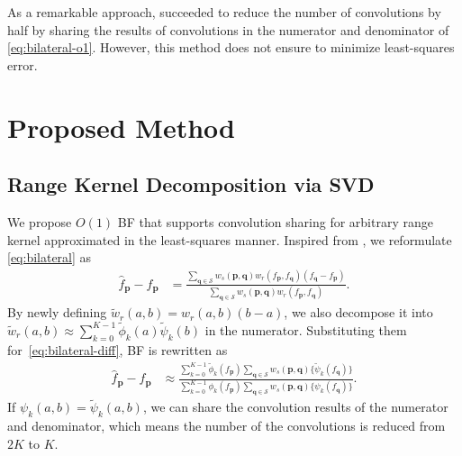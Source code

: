 \documentclass{article}
\begin{document}
As a remarkable approach, \cite{deng2017fast} succeeded to reduce the number of convolutions by half by sharing the results of convolutions in the numerator and denominator of \eqref{eq:bilateral-o1}. However, this method does not ensure to minimize least-squares error.

\section{Proposed Method}
\subsection{Range Kernel Decomposition via SVD}

We propose $O(1)$ BF that supports convolution sharing for arbitrary range kernel approximated in the least-squares manner.
Inspired from \cite{deng2017fast}, we reformulate \eqref{eq:bilateral} as
\vspace{-1mm}
\begin{align}
    \hat{f}_{\bm{p}}-f_{\bm{p}} &= \frac{
        \sum_{\bm{q}\in\mathcal{S}} w_s(\bm{p},\bm{q})w_r(f_{\bm{p}},f_{\bm{q}})(f_{\bm{q}}-f_{\bm{p}})
    }{
        \sum_{\bm{q}\in\mathcal{S}} w_s(\bm{p},\bm{q})w_r(f_{\bm{p}},f_{\bm{q}})
    }.
\label{eq:bilateral-diff}
\end{align}
By newly defining $\tilde{w}_r(a,b)=w_r(a,b)(b-a)$, we also decompose it into $\tilde{w}_r(a,b) \approx \sum_{k=0}^{K-1} \tilde{\phi}_k(a) \tilde{\psi}_k(b)$ in the numerator.
Substituting them for~\eqref{eq:bilateral-diff}, BF is rewritten as
\vspace{-1mm}
\begin{align}
    \hat{f}_{\bm{p}}\!-\!f_{\bm{p}} &\approx \frac{
        \sum_{k=0}^{K-1} \tilde{\phi}_k(f_{\bm{p}})
        \sum_{\bm{q}\in\mathcal{S}} w_s(\bm{p},\bm{q}) \{ \tilde{\psi}_k(f_{\bm{q}}) \}
    }{
        \sum_{k=0}^{K-1} \phi_k(f_{\bm{p}})
        \sum_{\bm{q}\in\mathcal{S}} w_s(\bm{p},\bm{q}) \{ \psi_k(f_{\bm{q}}) \}
    }.
\label{eq:bilateral-ours}
\end{align}
If $\psi_k(a,b)=\tilde{\psi}_k(a,b)$, we can share the convolution results of the numerator and denominator, which means the number of the convolutions is reduced from $2K$ to $K$.
\end{document}

